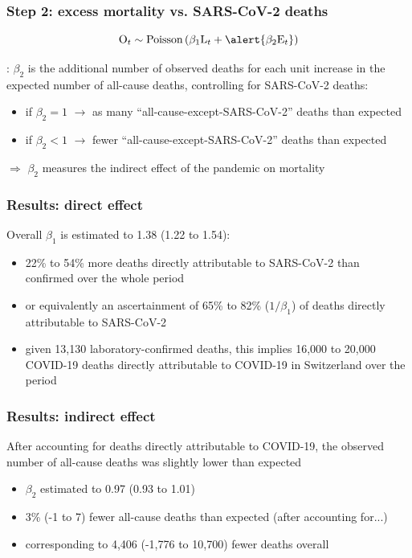 \documentclass[10pt]{beamer}
\begin{document}
\begin{frame}
	\frametitle{Step 2: excess mortality vs. SARS-CoV-2 deaths}
	$$\text{O}_{t} \sim \text{Poisson}\left( \beta_1\text{L}_{t} + \alert{\beta_2\text{E}_{t}} \right)$$
	\bigskip
	
	\underline{}: $\beta_2$ is the additional number of observed deaths \alert{for each unit increase in the expected number of all-cause deaths}, controlling for SARS-CoV-2 deaths:
	\begin{itemize}
		\item if $\beta_2=1$ $\rightarrow$ as many ``all-cause-except-SARS-CoV-2'' deaths than expected
		\item if $\beta_2<1$ $\rightarrow$ fewer ``all-cause-except-SARS-CoV-2'' deaths than expected
	\end{itemize}
	\bigskip
	
	\alert{$\Rightarrow$} $\beta_2$ measures the \alert{indirect effect} of the pandemic on mortality
	
\end{frame}

%

\begin{frame}
	\frametitle{Results: direct effect}
	Overall $\beta_1$ is estimated to \alert{1.38 (1.22 to 1.54)}:
	\begin{itemize}
		\item \alert{22\% to 54\% more deaths} directly attributable to SARS-CoV-2 than confirmed over the whole period
		\item or equivalently an \alert{ascertainment of 65\% to 82\%} ($1/\beta_1$) of deaths directly attributable to SARS-CoV-2
		\item given 13,130 laboratory-confirmed deaths, this implies \alert{16,000 to 20,000 COVID-19 deaths} directly attributable to COVID-19 in Switzerland over the period
	\end{itemize}
\end{frame}

\begin{frame}
	\frametitle{Results: indirect effect}
	After \alert{accounting for deaths directly attributable to COVID-19}, the observed number of all-cause deaths was slightly \alert{lower than expected}
	\begin{itemize}
		\item $\beta_2$ estimated to 0.97 (0.93 to 1.01)
		\item 3\% (-1 to 7) fewer all-cause deaths than expected (after accounting for...)
		\item corresponding to 4,406 (-1,776 to 10,700) fewer deaths overall
	\end{itemize}
\end{frame}
\end{document}
